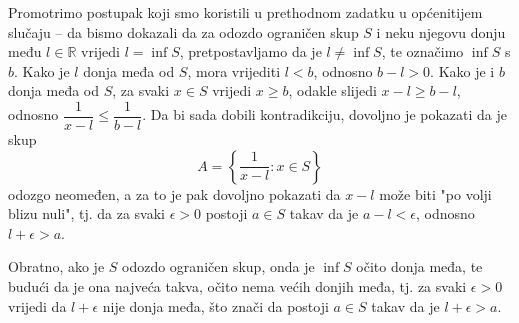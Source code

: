 Promotrimo postupak koji smo koristili u prethodnom zadatku u općenitijem slučaju -- da bismo dokazali da za odozdo ograničen skup $S$ i neku njegovu donju među $l\in \mathbb{R}$ vrijedi $l=\inf{S}$, pretpostavljamo da je $l\neq \inf{S}$, te označimo $\inf{S}$ s $b$. Kako je $l$ donja međa od $S$, mora vrijediti $l<b$, odnosno $b-l>0$. Kako je i $b$ donja međa od $S$, za svaki $x\in S$ vrijedi $x\geq b$, odakle slijedi $x-l\geq b-l$, odnosno $\dfrac{1}{x-l}\leq \dfrac{1}{b-l}$. Da bi sada dobili kontradikciju, dovoljno je pokazati da je skup
$$A=\left\{\dfrac{1}{x-l} : x\in S\right\}$$
odozgo neomeđen, a za to je pak dovoljno pokazati da $x-l$ može biti "po volji blizu nuli", tj. da za svaki $\epsilon>0$ postoji $a\in S$ takav da je $a-l<\epsilon$, odnosno $l+\epsilon>a$.

Obratno, ako je $S$ odozdo ograničen skup, onda je $\inf{S}$ očito donja međa, te budući da je ona najveća takva, očito nema većih donjih međa, tj. za svaki $\epsilon>0$ vrijedi da $l+\epsilon$ nije donja međa, što znači da postoji $a\in S$ takav da je $l+\epsilon>a$.

